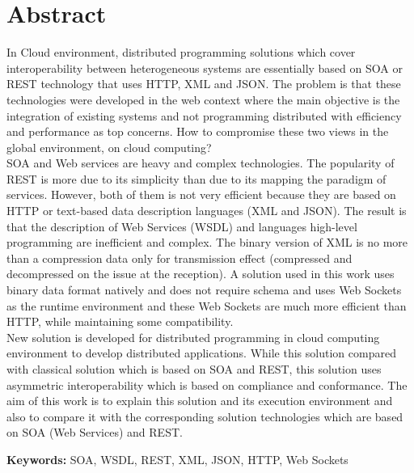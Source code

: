
\section*{Abstract}


In Cloud environment, distributed programming solutions which cover interoperability between heterogeneous systems are essentially based on SOA or REST technology that uses HTTP, XML and JSON. The problem is that these technologies
were developed in the web context where the main objective is the integration of existing systems and not programming
distributed with efficiency and performance as top concerns. How to compromise these two views in the global environment,
on cloud computing?\\

SOA and Web services are heavy and complex technologies. The popularity of REST is more due to its simplicity than due to its
mapping the paradigm of services. However, both of them is not very efficient because they are based on HTTP or
text-based data description languages (XML and JSON). The result is that the description of Web Services (WSDL) and languages
high-level programming are inefficient and complex. The binary version of XML is no more than a compression
data only for transmission effect (compressed and decompressed on the issue at the reception). A solution used in this work uses binary data format natively and does not require schema and uses Web Sockets as the runtime environment and these Web Sockets are much more efficient than HTTP, while maintaining some compatibility.\\

New solution is developed for distributed programming in cloud computing environment to develop distributed applications. While this solution compared with classical solution which is based on SOA and REST, this solution uses asymmetric interoperability which is based on compliance and conformance. The aim of this work is to explain this solution and its execution environment and also to compare it with the corresponding solution technologies which are based on SOA (Web Services) and REST.


\vfill

\textbf{\Large Keywords:} SOA, WSDL, REST, XML, JSON, HTTP, Web Sockets
